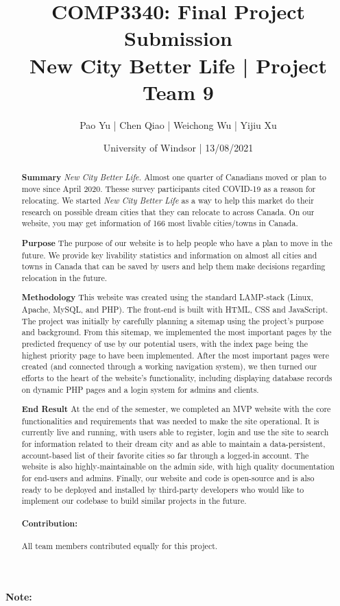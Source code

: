 \documentclass[12pt, letterpaper]{article}
\title{COMP3340: Final Project Submission \\{New City Better Life | Project Team 9}}
\author{Pao Yu | Chen Qiao | Weichong Wu | Yijiu Xu}
\date{University of Windsor | 13/08/2021}
\begin{document}
\maketitle

\paragraph*{Note: } 

\begin{abstract}

    \textbf{Summary}
    \textit{New City Better Life.} Almost one quarter of Canadians moved or plan to move since April 2020. Thesse survey participants cited COVID-19 as a reason for relocating. We started \textit{New City Better Life} as a way to help this market do their research on possible dream cities that they can relocate to across Canada. On our website, you may get information of 166 most livable cities/towns in Canada.
    
    \textbf{Purpose}
    The purpose of our website is to help people who have a plan to move in the future. We provide key livability statistics and information on almost all cities and towns in Canada that can be saved by users and help them make decisions regarding relocation in the future.
   
    \textbf{Methodology}
    This website was created using the standard LAMP-stack (Linux, Apache, MySQL, and PHP). The front-end is built with HTML, CSS and JavaScript. The project was initially by carefully planning a sitemap using the project's purpose and background. From this sitemap, we implemented the most important pages by the predicted frequency of use by our potential users, with the index page being the highest priority page to have been implemented. After the most important pages were created (and connected through a working navigation system), we then turned our efforts to the heart of the website's functionality, including displaying database records on dynamic PHP pages and a login system for admins and clients.

    \textbf{End Result}
    At the end of the semester, we completed an MVP website with the core functionalities and requirements that was needed to make the site operational. It is currently live and running, with users able to register, login and use the site to search for information related to their dream city and as able to maintain a data-persistent, account-based list of their favorite cities so far through a logged-in account. The website is also highly-maintainable on the admin side, with high quality documentation for end-users and admins. Finally, our website and code is open-source and is also ready to be deployed and installed by third-party developers who would like to implement our codebase to build similar projects in the future.

\paragraph*{Contribution: } All team members contributed equally for this project.

\end{abstract}
\end{document}
